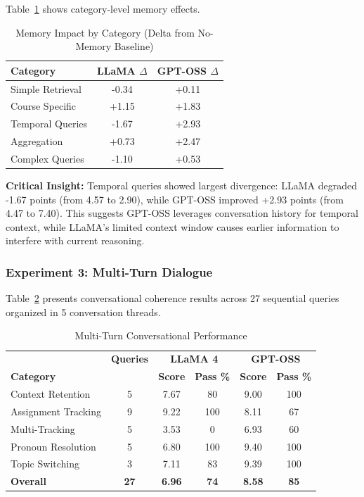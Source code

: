 \documentclass{article}
\begin{document}
Table~\ref{tab:memory_category} shows category-level memory effects.

\begin{table}[h]
\centering
\caption{Memory Impact by Category (Delta from No-Memory Baseline)}
\label{tab:memory_category}
\begin{tabular}{lcc}
\toprule
\textbf{Category} & \textbf{LLaMA $\Delta$} & \textbf{GPT-OSS $\Delta$} \\
\midrule
Simple Retrieval & -0.34 & +0.11 \\
Course Specific & +1.15 & +1.83 \\
Temporal Queries & -1.67 & +2.93 \\
Aggregation & +0.73 & +2.47 \\
Complex Queries & -1.10 & +0.53 \\
\bottomrule
\end{tabular}
\end{table}

\textbf{Critical Insight:} Temporal queries showed largest divergence: LLaMA degraded -1.67 points (from 4.57 to 2.90), while GPT-OSS improved +2.93 points (from 4.47 to 7.40). This suggests GPT-OSS leverages conversation history for temporal context, while LLaMA's limited context window causes earlier information to interfere with current reasoning.

\subsubsection{Experiment 3: Multi-Turn Dialogue}

Table~\ref{tab:multiturn} presents conversational coherence results across 27 sequential queries organized in 5 conversation threads.

\begin{table}[h]
\centering
\caption{Multi-Turn Conversational Performance}
\label{tab:multiturn}
\begin{tabular}{lccccc}
\toprule
 & \textbf{Queries} & \multicolumn{2}{c}{\textbf{LLaMA 4}} & \multicolumn{2}{c}{\textbf{GPT-OSS}} \\
\textbf{Category} & & \textbf{Score} & \textbf{Pass \%} & \textbf{Score} & \textbf{Pass \%} \\
\midrule
Context Retention & 5 & 7.67 & 80 & 9.00 & 100 \\
Assignment Tracking & 9 & 9.22 & 100 & 8.11 & 67 \\
Multi-Tracking & 5 & 3.53 & 0 & 6.93 & 60 \\
Pronoun Resolution & 5 & 6.80 & 100 & 9.40 & 100 \\
Topic Switching & 3 & 7.11 & 83 & 9.39 & 100 \\
\midrule
\textbf{Overall} & \textbf{27} & \textbf{6.96} & \textbf{74} & \textbf{8.58} & \textbf{85} \\
\bottomrule
\end{tabular}
\end{table}
\end{document}
